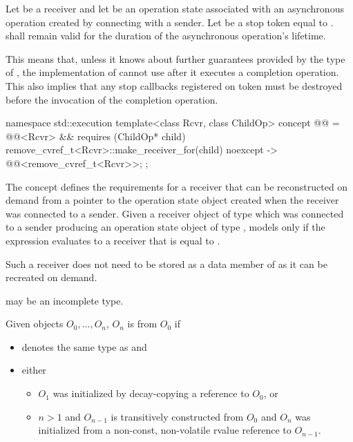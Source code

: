\pnum
Let  be a receiver and
let  be an operation state associated with
an asynchronous operation created by connecting  with a sender.
Let  be a stop token equal to
.
 shall remain valid
for the duration of the asynchronous operation's lifetime.
\begin{note}
This means that, unless it knows about further guarantees
provided by the type of ,
the implementation of  cannot use 
after it executes a completion operation.
This also implies that any stop callbacks registered on token
must be destroyed before the invocation of the completion operation.
\end{note}

\pnum
\begin{codeblock}
namespace std::execution {
  template<class Rcvr, class ChildOp>
    concept @@ = @@<Rcvr> &&
      requires (ChildOp* child) {
        { remove_cvref_t<Rcvr>::make_receiver_for(child) } noexcept
          -> @@<remove_cvref_t<Rcvr>>;
      };
}
\end{codeblock}

The  concept
defines the requirements for a receiver
that can be reconstructed on demand
from a pointer to the operation state object
created when the receiver was connected to a sender.
Given a receiver object  of type 
which was connected to a sender producing
an operation state object  of type ,
 models 
only if the expression 
evaluates to a receiver
that is equal to .
\begin{note}
Such a receiver does not need to be stored as a data member of 
as it can be recreated on demand.
\end{note}
 may be an incomplete type.

\pnum
Given objects $O_0, \dotsc, O_n$,
$O_n$ is  from $O_0$ if
\begin{itemize}
\item
{}
denotes the same type as
 and
\item
either
\begin{itemize}
\item
$O_1$ was initialized by decay-copying a reference to $O_0$, or
\item
$n > 1$ and $O_{n-1}$ is transitively constructed from $O_0$ and
$O_n$ was initialized from
a non-const, non-volatile rvalue reference to $O_{n-1}$.
\end{itemize}
\end{itemize}

